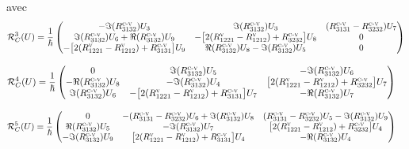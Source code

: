 \documentclass[12pt,a4paper,openany,oneside]{book}
\begin{document}
{{{{{{avec 
\begin{eqnarray*}
\begin{split}
\mathcal{R}^{3}_{C}(U)&= \dfrac{1}{\hbar}
\begin{pmatrix}
-\Im(R^{\textsc{c-v}}_{3132})U_{3} & \Im(R^{\textsc{c-v}}_{3132})U_{3} & (R^{\textsc{c-v}}_{3131}-R^{\textsc{c-v}}_{3232})U_{7}\\
\Im(R^{\textsc{c-v}}_{3132})U_{6}+\Re(R^{\textsc{c-v}}_{3132})U_{9} &
-\big[2(R^{\textsc{v}}_{1221}-R^{\textsc{v}}_{1212})+R^{\textsc{c-v}}_{3232}\big]U_{8} & 0 \\
-\big[2(R^{\textsc{v}}_{1221}-R^{\textsc{v}}_{1212})+R^{\textsc{c-v}}_{3131}\big]U_{9} & 
\Re(R^{\textsc{c-v}}_{3132})U_{8}- \Im(R^{\textsc{c-v}}_{3132})U_{5} & 0
\end{pmatrix}\\
\end{split}
\end{eqnarray*}

\begin{small}
\begin{eqnarray*}
\begin{split}
\mathcal{R}^{4}_{C}(U)&= \dfrac{1}{\hbar}
\begin{pmatrix}
0 & \Im(R^{\textsc{c-v}}_{3132})U_{5} & -\Im(R^{\textsc{c-v}}_{3132})U_{6} \\
-\Re(R^{\textsc{c-v}}_{3132})U_{8} & -\Im(R^{\textsc{c-v}}_{3132})U_{4} & \big[2(R^{\textsc{v}}_{1221}-R^{\textsc{v}}_{1212})+R^{\textsc{c-v}}_{3232}\big]U_{7}\\
\Im(R^{\textsc{c-v}}_{3132})U_{6} & -\big[2(R^{\textsc{v}}_{1221}-R^{\textsc{v}}_{1212})+R^{\textsc{c-v}}_{3131}\big]U_{7} & -\Re(R^{\textsc{c-v}}_{3132})U_{7}
\end{pmatrix}
\end{split}
\end{eqnarray*}


\begin{eqnarray*}
\begin{split}
\mathcal{R}^{5}_{C}(U)&= \dfrac{1}{\hbar}
\begin{pmatrix}
0 & -(R^{\textsc{c-v}}_{3131}-R^{\textsc{c-v}}_{3232})U_{6}+\Im(R^{\textsc{c-v}}_{3132})U_{8} & (R^{\textsc{c-v}}_{3131}-R^{\textsc{c-v}}_{3232})U_{5}-\Im(R^{\textsc{c-v}}_{3132})U_{9} \\
\Re(R^{\textsc{c-v}}_{3132})U_{5} & -\Im(R^{\textsc{c-v}}_{3132})U_{7} & \big[2(R^{\textsc{v}}_{1221}-R^{\textsc{v}}_{1212})+R^{\textsc{c-v}}_{3232}\big]U_{4}\\
-\Im(R^{\textsc{c-v}}_{3132})U_{9} & \big[2(R^{\textsc{v}}_{1221}-R^{\textsc{v}}_{1212})+R^{\textsc{c-v}}_{3131}\big]U_{4} & -\Re(R^{\textsc{c-v}}_{3132})U_{4}
\end{pmatrix}
\end{split}
\end{eqnarray*}
\end{small}

}}}}}}
\end{document}
